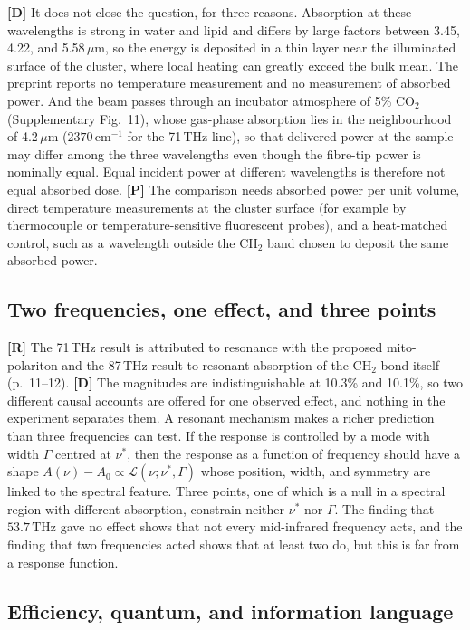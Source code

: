 \documentclass[11pt]{article}
\newcommand{\stR}{\textbf{\textcolor{blue!55!black}{[R]}}}
\newcommand{\stD}{\textbf{\textcolor{green!40!black}{[D]}}}
\newcommand{\stP}{\textbf{\textcolor{violet!80!black}{[P]}}}
\newcommand{\thz}{\,\mathrm{THz}}
\newcommand{\cmi}{\,\mathrm{cm^{-1}}}
\theoremstyle{plain}
\theoremstyle{definition}
\theoremstyle{remark}
\begin{document}
\stD{} It does not close the question, for three reasons. Absorption at these wavelengths is strong in water and lipid and differs by large factors between 3.45, 4.22, and 5.58\,$\mu$m, so the energy is deposited in a thin layer near the illuminated surface of the cluster, where local heating can greatly exceed the bulk mean. The preprint reports no temperature measurement and no measurement of absorbed power. And the beam passes through an incubator atmosphere of 5\% CO$_2$ (Supplementary Fig.~11), whose gas-phase absorption lies in the neighbourhood of 4.2\,$\mu$m ($2370\cmi$ for the 71\,THz line), so that delivered power at the sample may differ among the three wavelengths even though the fibre-tip power is nominally equal. Equal incident power at different wavelengths is therefore not equal absorbed dose. \stP{} The comparison needs absorbed power per unit volume, direct temperature measurements at the cluster surface (for example by thermocouple or temperature-sensitive fluorescent probes), and a heat-matched control, such as a wavelength outside the CH$_2$ band chosen to deposit the same absorbed power.

\subsection{Two frequencies, one effect, and three points}

\stR{} The 71\,THz result is attributed to resonance with the proposed mito-polariton and the 87\,THz result to resonant absorption of the CH$_2$ bond itself (p.~11--12). \stD{} The magnitudes are indistinguishable at 10.3\% and 10.1\%, so two different causal accounts are offered for one observed effect, and nothing in the experiment separates them. A resonant mechanism makes a richer prediction than three frequencies can test. If the response is controlled by a mode with width $\Gamma$ centred at $\nu^*$, then the response as a function of frequency should have a shape $A(\nu)-A_0\propto\mathcal L(\nu;\nu^*,\Gamma)$ whose position, width, and symmetry are linked to the spectral feature. Three points, one of which is a null in a spectral region with different absorption, constrain neither $\nu^*$ nor $\Gamma$. The finding that $53.7\thz$ gave no effect shows that not every mid-infrared frequency acts, and the finding that two frequencies acted shows that at least two do, but this is far from a response function.

\subsection{Efficiency, quantum, and information language}
\end{document}
